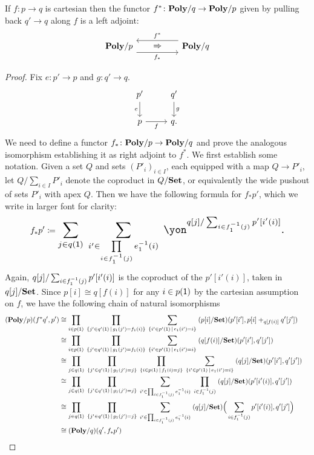 \documentclass[DynamicalBook]{subfiles}
\begin{document}
\begin{theorem}\label{thm.cart_exponentiable}
If $f\colon p\to q$ is cartesian then the functor $f^*\colon\textbf{Poly}/q\to\textbf{Poly}/p$ given by pulling back $q'\to q$ along $f$ is a left adjoint:
\[
\begin{tikzcd}[column sep=50pt, background color=theoremcolor]
	\poly/p\ar[r, shift right=7pt, "f_*"']&
	\poly/q\ar[l, shift right=7pt, "f^*"']\ar[l, phantom, "\Rightarrow"]
\end{tikzcd}
\]
\end{theorem}
\begin{proof}
Fix $e\colon p'\to p$ and $g\colon q'\to q$.
\[
\begin{tikzcd}
	p'\ar[d, "e"']&q'\ar[d, "g"]\\
	p\ar[r, "f"']&q.
\end{tikzcd}
\]
We need to define a functor $f_*\colon\textbf{Poly}/p\to\textbf{Poly}/q$ and prove the analogous isomorphism establishing it as right adjoint to $f^*$. We first establish some notation. Given a set $Q$ and sets $(P'_i)_{i\in I}$, each equipped with a map $Q\to P'_i$, let $Q/\sum_{i\in I}P'_i$ denote the coproduct in $Q/\textbf{Set}$, or equivalently the wide pushout of sets $P'_i$ with apex $Q$. Then we have the following formula for $f_*p'$, which we write in larger font for clarity:
\begin{equation}\label{eqn.cart_exp}
f_*p'\coloneqq
\scalebox{1.3}{$\displaystyle
\sum_{j\in q(\1)}\;\sum_{i'\in\prod\limits_{i\in f_1\inv(j)}e_1\inv(i)}\;\yon^{q[j]/\sum_{i\in f_1\inv(j)}p'[i'(i)]}.
$}
\end{equation}
Again, $q[j]/\sum_{i\in f_1^{-1}(j)}p'[i'(i)]$ is the coproduct of the $p'[i'(i)]$, taken in $q[j]/\textbf{Set}$. Since $p[i]\cong q[f(i)]$ for any $i\in p(\textsf{1})$ by the cartesian assumption on $f$, we have the following chain of natural isomorphisms
\begin{align*}
	(\textbf{Poly}/p)(f^*q', p')&\cong
	\prod_{i\in p(\textsf{1})}\;\prod_{\{j'\in q'(\textsf{1})\,\mid\,g_1(j')=f_1(i)\}}\;\sum_{\{i'\in p'(\textsf{1})\,\mid\,e_1(i')=i\}}\;(p[i]/\textbf{Set})(p'[i'],p[i]+_{q[f(i)]}q'[j'])\\&\cong
	\prod_{i\in p(\textsf{1})}\;\prod_{\{j'\in q'(\textsf{1})\,\mid\,g_1(j')=f_1(i)\}}\;\sum_{\{i'\in p'(\textsf{1})\,\mid\,e_1(i')=i\}}\;(q[f(i)]/\textbf{Set})(p'[i'],q'[j'])\\&\cong
	\prod_{j\in q(\textsf{1})}\;\prod_{\{j'\in q'(\textsf{1})\,\mid\, g_1(j')=j\}}\;\prod_{\{i\in p(\textsf{1})\,\mid\,f_1(i)=j\}}\;\sum_{\{i'\in p'(\textsf{1})\,\mid\,e_1(i')=i\}}\;(q[j]/\textbf{Set})(p'[i'],q'[j'])\\&\cong
	\prod_{j\in q(\textsf{1})}\;\prod_{\{j'\in q'(\textsf{1})\,\mid\, g_1(j')=j\}}\;\sum_{i'\in\prod_{i\in f_1^{-1}(j)}e_1^{-1}(i)}\;\prod_{i\in f_1^{-1}(j)}\;(q[j]/\textbf{Set})(p'[i'(i)],q'[j'])\\&\cong
	\prod_{j\in q(\textsf{1})}\;\prod_{\{j'\in q'(\textsf{1})\,\mid\, g_1(j')=j\}}\;\sum_{i'\in\prod_{i\in f_1^{-1}(j)}e_1^{-1}(i)}\;(q[j]/\textbf{Set})\Big(\sum_{i\in f_1^{-1}(j)}p'[i'(i)],q'[j']\Big)\\&\cong
	(\textbf{Poly}/q)(q',f_*p')
	&\qedhere
\end{align*}
\end{proof}
\end{document}

